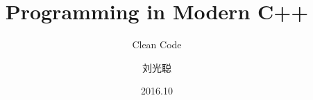 \title[Clean Code]
{Programming in Modern C++}

\subtitle{Clean Code}

\author[刘光聪]
{ 刘光聪
}

\institute[]
{
}

\date[2016.10]{2016.10}